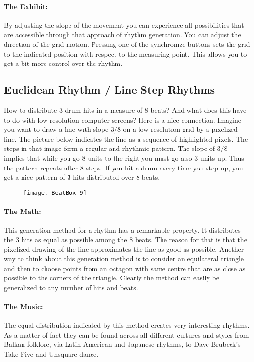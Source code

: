 \paragraph{The Exhibit:} By adjusting the slope of the movement you can experience all possibilities that are accessible through that approach of rhythm generation. You can adjust the direction of the grid motion. Pressing one of the synchronize buttons sets the grid to the indicated position with respect to the measuring point. This allows you to get a bit more control over the rhythm. 


\subsection{Euclidean Rhythm / Line Step Rhythms}
How to distribute 3 drum hits in a measure of 8 beats? And what does this have to do with low resolution computer screens? Here is a nice connection. Imagine you want to draw a line with slope 3/8 on a low resolution grid by a pixelized line. The picture below indicates the line as a sequence of highlighted pixels. The steps in that image form a regular and rhythmic pattern. The slope of 3/8 implies that while you go 8 units to the right you must go also 3 units up. Thus the pattern repeats after 8 steps. If you hit a drum every time you step up, you get a nice pattern of 3 hits distributed over 8 beats.

\begin{figure}[h]
\centering
\texttt{[image: BeatBox\_9]}
\end{figure}

\paragraph{The Math:} This generation method for a rhythm has a remarkable property. It distributes the 3 hits as equal as possible among the 8 beats. The reason for that is that the pixelized drawing of the line approximates the line as good as possible. Another way to think about this generation method is to consider an equilateral triangle and then to choose points from an octagon with same centre that are as close as possible to the corners of the triangle. Clearly the method can easily be generalized to any number of hits and beats.

\paragraph{The Music:} The equal distribution indicated by this method creates very interesting rhythms. As a matter of fact they can be found across all different cultures and styles from Balkan folklore, via Latin American and Japanese rhythms, to Dave Brubeck's Take Five and Unsquare dance.

